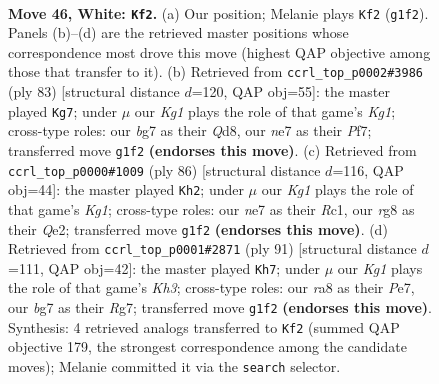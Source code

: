 \documentclass[11pt]{article}
\begin{document}
\clearpage

\begin{figure}[p]\centering
\begin{subfigure}{0.46\textwidth}\centering
\resizebox{\linewidth}{!}{%
\newchessgame
\chessboard[
  setfen={rn1qk1r1/4n1b1/2p3p1/3p2P1/3P1P1p/1PR4P/1BNQB2R/6K1 w - - 21 46},
  showmover=false,
  pgfstyle=straightmove, color=movearrow, markmove={g1-f2}
]}
\caption{}
\end{subfigure}\hfill
\begin{subfigure}{0.46\textwidth}\centering
\resizebox{\linewidth}{!}{%
\newchessgame
\chessboard[
  setfen={3qr1k1/1pp2p1r/8/3Pp1p1/pb2P3/4NPNP/PPR4K/5Q2 b - - 0 42},
  showmover=false,
  pgfstyle=straightmove, color=movearrow, markmove={g8-g7}
]}
\caption{}
\end{subfigure}
\\[4pt]
\begin{subfigure}{0.46\textwidth}\centering
\resizebox{\linewidth}{!}{%
\newchessgame
\chessboard[
  setfen={q1r1r1k1/2bn1pp1/p3pn1p/8/N1P5/1P2RNPP/1B2QP2/2R3K1 w - - 33 44},
  showmover=false,
  pgfstyle=straightmove, color=movearrow, markmove={g1-h2}
]}
\caption{}
\end{subfigure}\hfill
\begin{subfigure}{0.46\textwidth}\centering
\resizebox{\linewidth}{!}{%
\newchessgame
\chessboard[
  setfen={8/p3prr1/P1bq1p1k/3p1P1p/3P4/4N2P/3Q1RP1/4R1K1 b - - 4 46},
  showmover=false,
  pgfstyle=straightmove, color=movearrow, markmove={h6-h7}
]}
\caption{}
\end{subfigure}
\caption{\textbf{Move 46, White: \texttt{Kf2}.} (a) Our position; Melanie plays \texttt{Kf2} (\texttt{g1f2}). Panels (b)--(d) are the retrieved master positions whose correspondence most drove this move (highest QAP objective among those that transfer to it). (b) Retrieved from \texttt{ccrl\_top\_p0002\#3986} (ply 83) [structural distance $d$=120, QAP obj=55]: the master played \texttt{Kg7}; under $\mu$ our \emph{Kg1} plays the role of that game's \emph{Kg1}; cross-type roles: our \emph{b}g7 as their \emph{Q}d8, our \emph{n}e7 as their \emph{P}f7; transferred move \texttt{g1f2} \textbf{(endorses this move)}. (c) Retrieved from \texttt{ccrl\_top\_p0000\#1009} (ply 86) [structural distance $d$=116, QAP obj=44]: the master played \texttt{Kh2}; under $\mu$ our \emph{Kg1} plays the role of that game's \emph{Kg1}; cross-type roles: our \emph{n}e7 as their \emph{R}c1, our \emph{r}g8 as their \emph{Q}e2; transferred move \texttt{g1f2} \textbf{(endorses this move)}. (d) Retrieved from \texttt{ccrl\_top\_p0001\#2871} (ply 91) [structural distance $d$=111, QAP obj=42]: the master played \texttt{Kh7}; under $\mu$ our \emph{Kg1} plays the role of that game's \emph{Kh3}; cross-type roles: our \emph{r}a8 as their \emph{P}e7, our \emph{b}g7 as their \emph{R}g7; transferred move \texttt{g1f2} \textbf{(endorses this move)}. Synthesis: 4 retrieved analogs transferred to \texttt{Kf2} (summed QAP objective 179, the strongest correspondence among the candidate moves); Melanie committed it via the \texttt{search} selector.}
\label{fig:thought-m90}
\end{figure}
\end{document}
